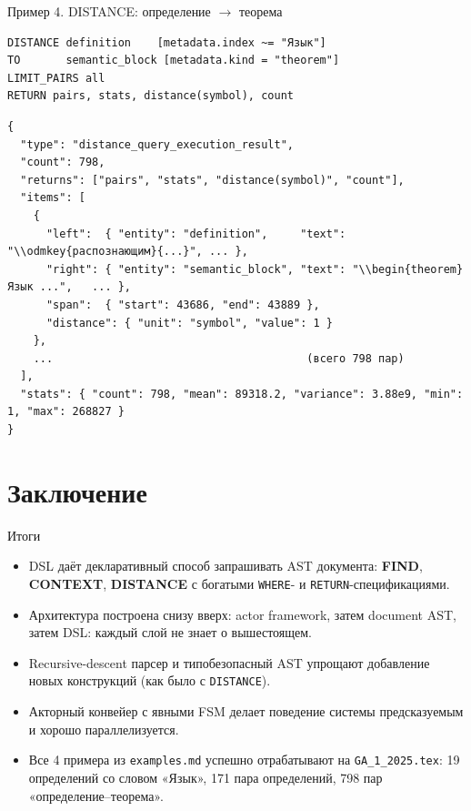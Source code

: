 \documentclass[aspectratio=169,11pt]{beamer}
\begin{document}
\begin{frame}[fragile]{Пример 4. DISTANCE: определение $\to$ теорема}
\begin{Verbatim}[fontsize=\small,frame=single,formatcom=\color{dslkw}]
DISTANCE definition    [metadata.index ~= "Язык"]
TO       semantic_block [metadata.kind = "theorem"]
LIMIT_PAIRS all
RETURN pairs, stats, distance(symbol), count
\end{Verbatim}
\begin{Verbatim}[fontsize=\scriptsize,frame=single]
{
  "type": "distance_query_execution_result",
  "count": 798,
  "returns": ["pairs", "stats", "distance(symbol)", "count"],
  "items": [
    {
      "left":  { "entity": "definition",     "text": "\\odmkey{распознающим}{...}", ... },
      "right": { "entity": "semantic_block", "text": "\\begin{theorem} Язык ...",   ... },
      "span":  { "start": 43686, "end": 43889 },
      "distance": { "unit": "symbol", "value": 1 }
    },
    ...                                       (всего 798 пар)
  ],
  "stats": { "count": 798, "mean": 89318.2, "variance": 3.88e9, "min": 1, "max": 268827 }
}
\end{Verbatim}
\end{frame}

\section{Заключение}

\begin{frame}{Итоги}
  \begin{itemize}
    \item DSL даёт декларативный способ запрашивать AST документа: \textbf{FIND},
          \textbf{CONTEXT}, \textbf{DISTANCE} с богатыми \texttt{WHERE}- и
          \texttt{RETURN}-спецификациями.
    \item Архитектура построена снизу вверх: actor framework, затем
          document AST, затем DSL: каждый слой не знает о вышестоящем.
    \item Recursive-descent парсер и типобезопасный AST упрощают добавление
          новых конструкций (как было с \texttt{DISTANCE}).
    \item Акторный конвейер с явными FSM делает поведение системы
          предсказуемым и хорошо параллелизуется.
    \item Все 4 примера из \texttt{examples.md} успешно отрабатывают на
          \texttt{GA\_1\_2025.tex}: 19 определений со словом «Язык», 171 пара
          определений, 798 пар «определение–теорема».
  \end{itemize}
\end{frame}
\end{document}
